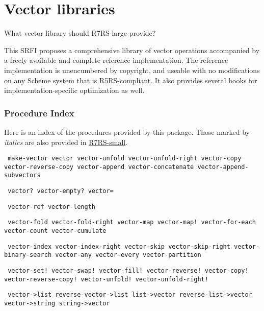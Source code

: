 \chapter{Vector libraries}

 What vector library should R7RS-large provide?

This SRFI proposes a comprehensive library of
vector operations accompanied by a freely available and complete
reference implementation. The reference implementation is unencumbered
by copyright, and useable with no modifications on any Scheme system
that is R5RS-compliant. It also provides
several hooks for implementation-specific optimization as well.


\subsection{Procedure Index}

Here is an index of the procedures provided by this package. Those
marked by \emph{italics} are also provided in
\protect\hyperlink{R7RS-small}{R7RS-small}.

\begin{description}\obeyspaces\obeylines
\item[Constructors]%
\texttt{%
make-vector            vector                vector-unfold
vector-unfold-right    vector-copy           vector-reverse-copy
vector-append          vector-concatenate    vector-append-subvectors}
\item[Predicates]
\texttt{%
vector?                vector-empty?         vector=}
\item[Selectors]
\texttt{%
vector-ref             vector-length}
\item[Iteration]
\texttt{%
vector-fold            vector-fold-right     vector-map
vector-map!            vector-for-each       vector-count
vector-cumulate}
\item[Searching]
\texttt{%
vector-index           vector-index-right    vector-skip
vector-skip-right      vector-binary-search  vector-any 
vector-every           vector-partition}
\item[Mutators]
\texttt{%
vector-set!            vector-swap!          vector-fill!
vector-reverse!        vector-copy!          vector-reverse-copy!
vector-unfold!         vector-unfold-right!}
\item[Conversion]
\texttt{%
vector->list           reverse-vector->list  list->vector
reverse-list->vector   vector->string        string->vector}
\end{description}

